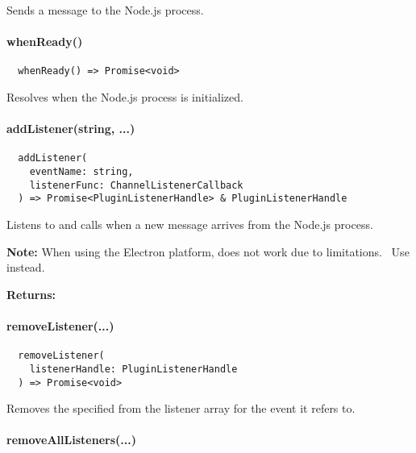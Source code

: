 Sends a message to the Node.js process.


\paragraph{whenReady()}

\begin{verbatim}
  whenReady() => Promise<void>
\end{verbatim}

Resolves when the Node.js process is initialized.


\newpage

\paragraph{addListener(string, ...)}

\begin{verbatim}
  addListener(
    eventName: string,
    listenerFunc: ChannelListenerCallback
  ) => Promise<PluginListenerHandle> & PluginListenerHandle
\end{verbatim}

Listens to  and calls  when a new message arrives from the Node.js process.

\textbf{Note:} When using the Electron platform,  does not work due to limitations.~\cite{capacitor-electron}
Use  instead.

\textbf{Returns:} 


\paragraph{removeListener(...)}

\begin{verbatim}
  removeListener(
    listenerHandle: PluginListenerHandle
  ) => Promise<void>
\end{verbatim}

Removes the specified  from the listener array for the event it refers to.


\paragraph{removeAllListeners(...)}

